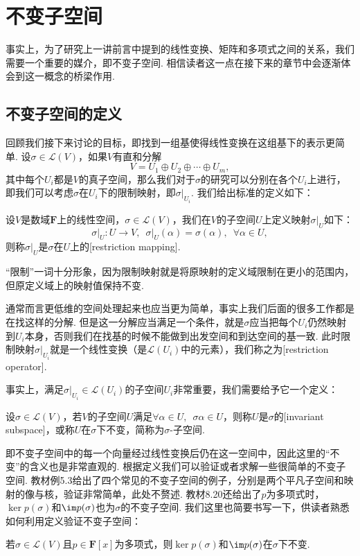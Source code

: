 \chapter{不变子空间}

事实上，为了研究上一讲前言中提到的线性变换、矩阵和多项式之间的关系，我们需要一个重要的媒介，即不变子空间. 相信读者这一点在接下来的章节中会逐渐体会到这一概念的桥梁作用.

\section{不变子空间的定义}

回顾我们接下来讨论的目标，即找到一组基使得线性变换在这组基下的表示更简单. 设$\sigma\in\mathcal{L}(V)$，如果$V$有直和分解
\[V=U_1\oplus U_2\oplus\cdots\oplus U_m,\]
其中每个$U_i$都是$V$的真子空间，那么我们对于$\sigma$的研究可以分别在各个$U_i$上进行，即我们可以考虑$\sigma$在$U_i$下的限制映射，即$\sigma\vert_{U_i}$. 我们给出标准的定义如下：
\begin{definition}
    设$V$是数域$\mathbf{F}$上的线性空间，$\sigma\in\mathcal{L}(V)$，我们在$V$的子空间$U$上定义映射$\sigma\vert_U$如下：
    \[\sigma\vert_U:U\to V,\enspace\sigma\vert_U(\alpha)=\sigma(\alpha),\enspace\forall \alpha\in U,\]
    则称$\sigma\vert_U$是$\sigma$在$U$上的[restriction mapping].
\end{definition}

``限制''一词十分形象，因为限制映射就是将原映射的定义域限制在更小的范围内，但原定义域上的映射值保持不变.

通常而言更低维的空间处理起来也应当更为简单，事实上我们后面的很多工作都是在找这样的分解. 但是这一分解应当满足一个条件，就是$\sigma$应当把每个$U_i$仍然映射到$U_i$本身，否则我们在找基的时候不能做到出发空间和到达空间的基一致. 此时限制映射$\sigma\vert_{U_i}$就是一个线性变换（是$\mathcal{L}(U_i)$中的元素），我们称之为[restriction operator].

事实上，满足$\sigma\vert_{U_i}\in\mathcal{L}(U_i)$的子空间$U_i$非常重要，我们需要给予它一个定义：
\begin{definition}
    设$\sigma\in \mathcal{L}(V)$，若$V$的子空间$U$满足$\forall \alpha\in U,\enspace \sigma\alpha\in U$，则称$U$是$\sigma$的[invariant subspace]，或称$U$在$\sigma$下不变，简称为$\sigma$-子空间.
\end{definition}
即不变子空间中的每一个向量经过线性变换后仍在这一空间中，因此这里的``不变''的含义也是非常直观的. 根据定义我们可以验证或者求解一些很简单的不变子空间. 教材例5.3给出了四个常见的不变子空间的例子，分别是两个平凡子空间和映射的像与核，验证非常简单，此处不赘述. 教材8.20还给出了$p$为多项式时，$\ker p(\sigma)$和$\im p(\sigma)$也为$\sigma$的不变子空间. 我们这里也简要书写一下，供读者熟悉如何利用定义验证不变子空间：
\begin{example}
    若$\sigma\in\mathcal{L}(V)$且$p\in\mathbf{F}[x]$为多项式，则$\ker p(\sigma)$和$\im p(\sigma)$在$\sigma$下不变.
\end{example}

